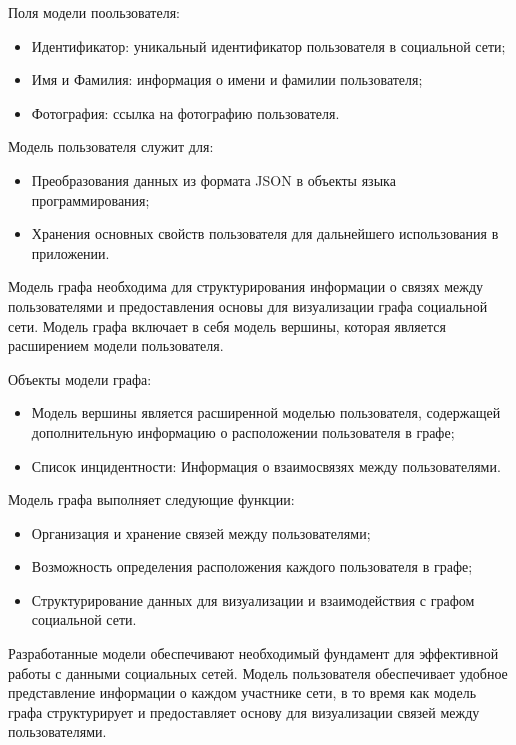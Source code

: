\documentclass[14pt, russian]{scrartcl}
\begin{document}
Поля модели поользователя:

\begin{itemize}
  \item Идентификатор: уникальный идентификатор пользователя в социальной сети;
  \item Имя и Фамилия: информация о имени и фамилии пользователя;
  \item Фотография: ссылка на фотографию пользователя.
\end{itemize}


Модель пользователя служит для:

\begin{itemize}
  \item Преобразования данных из формата JSON в объекты языка программирования;
  \item Хранения основных свойств пользователя для дальнейшего использования в приложении.
\end{itemize}

Модель графа необходима для структурирования информации о связях между пользователями и предоставления основы для визуализации графа социальной сети. Модель графа включает в себя модель вершины, которая является расширением модели пользователя.


Объекты модели графа:

\begin{itemize}
  \item Модель вершины является расширенной моделью пользователя, содержащей дополнительную информацию о расположении пользователя в графе;
  \item Список инцидентности: Информация о взаимосвязях между пользователями.
\end{itemize}

Модель графа выполняет следующие функции:

\begin{itemize}
  \item Организация и хранение связей между пользователями;
  \item Возможность определения расположения каждого пользователя в графе;
  \item Структурирование данных для визуализации и взаимодействия с графом социальной сети.
\end{itemize}

Разработанные модели обеспечивают необходимый фундамент для эффективной работы с данными социальных сетей. Модель пользователя обеспечивает удобное представление информации о каждом участнике сети, в то время как модель графа структурирует и предоставляет основу для визуализации связей между пользователями.
\end{document}
